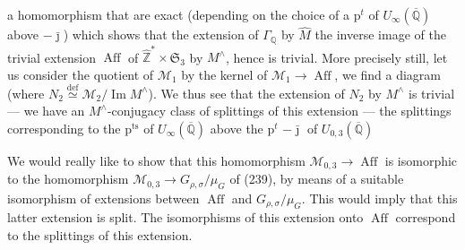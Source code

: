 a  homomorphism  that are exact
(depending on the choice of a $\mathrm p^{t}$ of $U_\infty(\overline{\mathbb Q})$
above $-\bar{\jmath}$)
which shows that the extension  of
$\Gamma_{\mathbb Q}$ by $\widehat M$
 the inverse image of the trivial extension
$\operatorname{Aff}$ of $\widehat{\mathbb Z}^{*}\times\mathfrak S_3$
by $M^\wedge$, hence is trivial.
More precisely still, let us consider the quotient 
of $\mathcal M_1$ by the kernel of $\mathcal M_1\longrightarrow\operatorname{Aff}$,
we find a diagram
(where $N_2\overset{\mathrm{def}}{\simeq}\mathcal M_2/\operatorname{Im}M^\wedge$).
We thus see that the extension of $N_2$ by $M^\wedge$ is trivial
--- we have an $M^\wedge$-conjugacy class of splittings of this
extension --- the splittings corresponding to the $\mathrm p^{\mathrm{ts}}$ of
$U_\infty(\overline{\mathbb Q})$ above the $\mathrm p^t$
$-\bar{\jmath}$ of $U_{0,3}(\overline{\mathbb Q})$



We would really like to show that this homomorphism
$\mathcal M_{0,3}\longrightarrow\operatorname{Aff}$ is isomorphic
to the homomorphism $\mathcal M_{0,3}\longrightarrow G_{\rho,\sigma}/\mu_G$
of (239), by means of a suitable isomorphism of extensions between
$\operatorname{Aff}$ and $G_{\rho,\sigma}/\mu_G$.
This would imply that this latter extension is split.
The isomorphisms of this extension onto $\operatorname{Aff}$
correspond  to the splittings of this extension.

